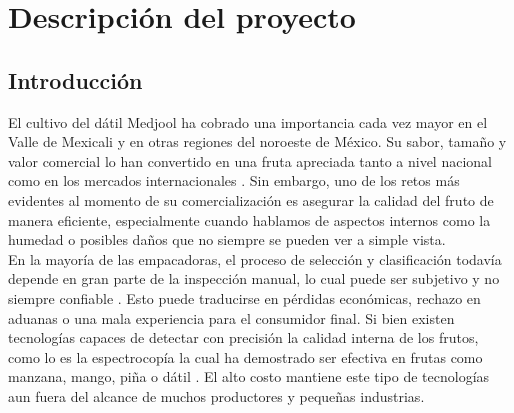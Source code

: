 
\chapter{Descripción del proyecto}

\label{Chapter1}


\newcommand{\keyword}[1]{\textbf{#1}}
\newcommand{\tabhead}[1]{\textbf{#1}}
\newcommand{\code}[1]{\texttt{#1}}
\newcommand{\file}[1]{\texttt{\bfseries#1}}
\newcommand{\option}[1]{\texttt{\itshape#1}}


\section{Introducción}

El cultivo del dátil Medjool ha cobrado una importancia cada vez mayor en el Valle de Mexicali y en otras regiones del noroeste de México. Su sabor, tamaño y valor comercial lo han convertido en una fruta apreciada tanto a nivel nacional como en los mercados internacionales \parencite{salomon-torres_produccion_2017}. Sin embargo, uno de los retos más evidentes al momento de su comercialización es asegurar la calidad del fruto de manera eficiente, especialmente cuando hablamos de aspectos internos como la humedad o posibles daños que no siempre se pueden ver a simple vista.\\

En la mayoría de las empacadoras, el proceso de selección y clasificación todavía depende en gran parte de la inspección manual, lo cual puede ser subjetivo y no siempre confiable \parencite{perez-perez_evaluation_2021}. Esto puede traducirse en pérdidas económicas, rechazo en aduanas o una mala experiencia para el consumidor final. Si bien existen tecnologías capaces de detectar con precisión la calidad interna de los frutos, como lo es la espectrocopía la cual ha demostrado ser efectiva en frutas como manzana, mango, piña o dátil \parencite{chen_prediction_2024, wang_improving_2025}. El alto costo mantiene este tipo de tecnologías aun fuera del alcance de muchos productores y pequeñas industrias.\\

